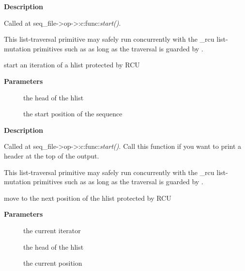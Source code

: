 \documentclass[a4paper,8pt,english]{sphinxmanual}
\begin{document}
\textbf{Description}

Called at seq\_file-\textgreater{}op-\textgreater{}:c:func:\emph{start()}.

This list-traversal primitive may safely run concurrently with
the \_rcu list-mutation primitives such as 
as long as the traversal is guarded by .

\begin{fulllineitems}
\label{filesystems/index:c.seq_hlist_start_head_rcu}
start an iteration of a hlist protected by RCU

\end{fulllineitems}


\textbf{Parameters}
\begin{description}
\item[{}] \leavevmode
the head of the hlist

\item[{}] \leavevmode
the start position of the sequence

\end{description}

\textbf{Description}

Called at seq\_file-\textgreater{}op-\textgreater{}:c:func:\emph{start()}. Call this function if you want to
print a header at the top of the output.

This list-traversal primitive may safely run concurrently with
the \_rcu list-mutation primitives such as 
as long as the traversal is guarded by .

\begin{fulllineitems}
\label{filesystems/index:c.seq_hlist_next_rcu}
move to the next position of the hlist protected by RCU

\end{fulllineitems}


\textbf{Parameters}
\begin{description}
\item[{}] \leavevmode
the current iterator

\item[{}] \leavevmode
the head of the hlist

\item[{}] \leavevmode
the current position

\end{description}
\end{document}
